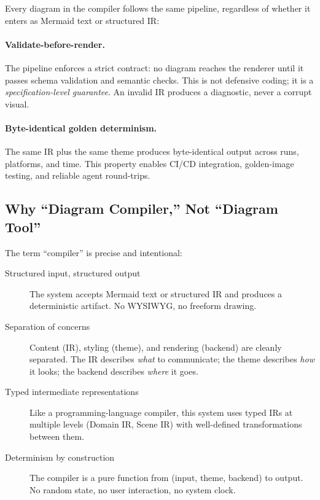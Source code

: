 Every diagram in the compiler follows the same pipeline, regardless of whether it enters
as Mermaid text or structured IR:


\paragraph{Validate-before-render.}
The pipeline enforces a strict contract: no diagram reaches the renderer until it passes schema validation and semantic checks. This is not defensive coding; it is a \emph{specification-level guarantee}. An invalid IR produces a diagnostic, never a corrupt visual.

\paragraph{Byte-identical golden determinism.}
The same IR plus the same theme produces byte-identical output across runs, platforms, and time. This property enables CI/CD integration, golden-image testing, and reliable agent round-trips.

\subsection{Why ``Diagram Compiler,'' Not ``Diagram Tool''}

The term ``compiler'' is precise and intentional:

\begin{description}
  \item[Structured input, structured output] The system accepts Mermaid text or structured IR
        and produces a deterministic artifact. No WYSIWYG, no freeform drawing.
  
  \item[Separation of concerns] Content (IR), styling (theme), and rendering (backend) are
        cleanly separated. The IR describes \emph{what} to communicate; the theme describes
        \emph{how} it looks; the backend describes \emph{where} it goes.
  
  \item[Typed intermediate representations] Like a programming-language compiler, this system
        uses typed IRs at multiple levels (Domain IR, Scene IR) with well-defined
        transformations between them.
  
  \item[Determinism by construction] The compiler is a pure function from
        (input, theme, backend) to output. No random state, no user interaction, no system clock.
\end{description}

